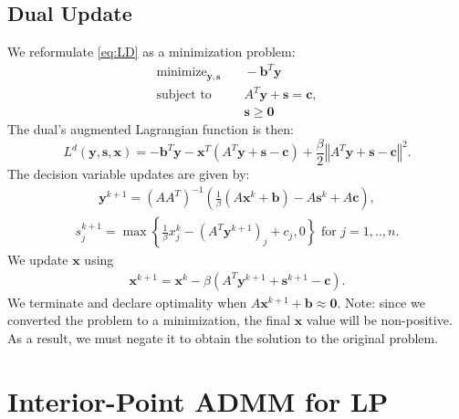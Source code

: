 \documentclass{article}
\begin{document}
\subsection*{Dual Update}
We reformulate \eqref{eq:LD} as a minimization problem:
\begin{align}
\text{minimize}_{\mathbf{y}, \mathbf{s}} &\quad -\mathbf{b}^T\mathbf{y}  \tag{LDR}\label{LDR} \\
\text{subject to } &\quad  A^T \mathbf{y}  + \mathbf{s} = \mathbf{c},  \nonumber \\
&\quad \mathbf{s} \geq \mathbf{0} \nonumber
\end{align}
The dual's augmented Lagrangian function is then:
\[
L^{d}(\mathbf{y},\mathbf{s},\mathbf{x})=-\mathbf{b}^{T}\mathbf{y}-\mathbf{x}^{T}\left(A^{T}\mathbf{y}+\mathbf{s}-\mathbf{c}\right)+\frac{\beta}{2}\left\Vert A^{T}\mathbf{y}+\mathbf{s}-\mathbf{c}\right\Vert ^{2}.
\]
The decision variable updates are given by:
\begin{align}\label{eq:y_dual_update}
\mathbf{y}^{k+1} = \left(AA^{T}\right)^{-1}\left(\frac{1}{\beta}\left(A\mathbf{x}^{k}+\mathbf{b}\right)-A\mathbf{s}^{k}+A\mathbf{c}\right),
\end{align}
\begin{align}\label{eq:s_dual_update}
s_j^{k+1} = \max\left\{ \frac{1}{\beta}{x}_j^k-(A^{T}\mathbf{y}^{k+1})_j+{c}_j,0\right\}  \text{ for $j = 1,..,n$}.
\end{align}
We update $\mathbf{x}$ using
\begin{align}\label{eq:x_dual_update}
\mathbf{x}^{k+1} = \mathbf{x}^k - \beta\left(A^T \mathbf{y}^{k+1} + \mathbf{s}^{k+1} - \mathbf{c}\right).
\end{align}
We terminate and declare optimality when $A \mathbf{x}^{k+1} + \mathbf{b} \approx \mathbf{0}$. Note: since we converted the problem to a minimization, the final $\mathbf{x}$ value will be non-positive. As a result, we must negate it to obtain the solution to the original problem.

\section{Interior-Point ADMM for LP}
\end{document}
